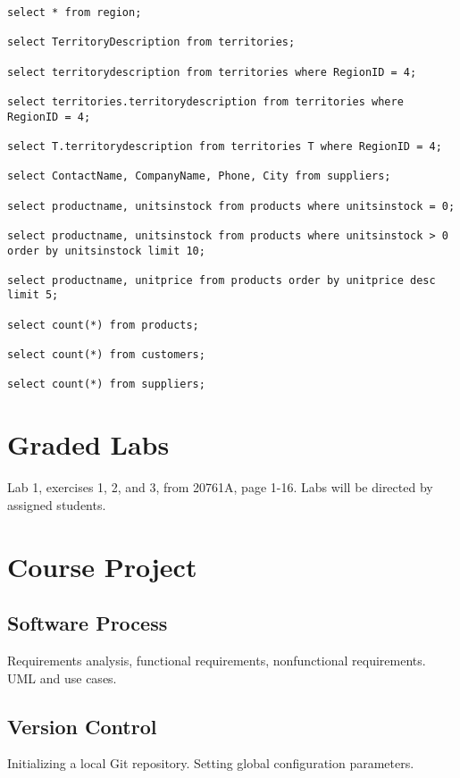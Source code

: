 \documentclass{article}
\begin{document}
        \begin{lstlisting}
select * from region;

select TerritoryDescription from territories;

select territorydescription from territories where RegionID = 4;

select territories.territorydescription from territories where RegionID = 4;

select T.territorydescription from territories T where RegionID = 4;

select ContactName, CompanyName, Phone, City from suppliers;

select productname, unitsinstock from products where unitsinstock = 0;

select productname, unitsinstock from products where unitsinstock > 0 order by unitsinstock limit 10;

select productname, unitprice from products order by unitprice desc limit 5;

select count(*) from products;

select count(*) from customers;

select count(*) from suppliers;
        \end{lstlisting}


    \section{Graded Labs}

Lab 1, exercises 1, 2, and 3, from 20761A, page 1-16. Labs will be directed by assigned students.

    \section{Course Project}


        \subsection{Software Process}

        Requirements analysis, functional requirements, nonfunctional requirements. UML and use cases.
        
        \subsection{Version Control}

        Initializing a local Git repository. Setting global configuration parameters.
\end{document}
